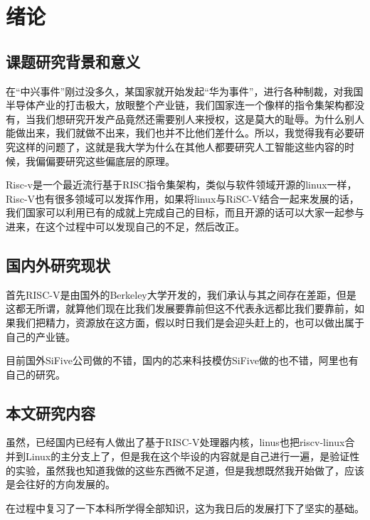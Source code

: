 \section{绪论}
\subsection{课题研究背景和意义}
在“中兴事件”刚过没多久，某国家就开始发起“华为事件”，进行各种制裁，对我国半导体产业的打击极大，放眼整个产业链，我们国家连一个像样的指令集架构都没有，当我们想研究开发产品竟然还需要别人来授权，这是莫大的耻辱。为什么别人能做出来，我们就做不出来，我们也并不比他们差什么。所以，我觉得我有必要研究这样的问题了，这就是我大学为什么在其他人都要研究人工智能这些内容的时候，我偏偏要研究这些偏底层的原理。

Risc-v是一个最近流行基于RISC指令集架构，类似与软件领域开源的linux一样，Risc-V也有很多领域可以发挥作用，如果将linux与RiSC-V结合一起来发展的话，我们国家可以利用已有的成就上完成自己的目标，而且开源的话可以大家一起参与进来，在这个过程中可以发现自己的不足，然后改正。


\subsection{国内外研究现状}
首先RISC-V是由国外的Berkeley大学开发的，我们承认与其之间存在差距，但是这都无所谓，就算他们现在比我们发展要靠前但这不代表永远都比我们要靠前，如果我们把精力，资源放在这方面，假以时日我们是会迎头赶上的，也可以做出属于自己的产业链。

目前国外SiFive公司做的不错，国内的芯来科技模仿SiFive做的也不错，阿里也有自己的研究。

\subsection{本文研究内容}
虽然，已经国内已经有人做出了基于RISC-V处理器内核，linus也把riscv-linux合并到Linux的主分支上了，但是我在这个毕设的内容就是自己进行一遍，是验证性的实验，虽然我也知道我做的这些东西微不足道，但是我想既然我开始做了，应该是会往好的方向发展的。

在过程中复习了一下本科所学得全部知识，这为我日后的发展打下了坚实的基础。


